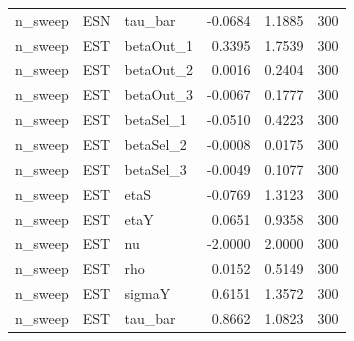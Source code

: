 \begin{table}[!h]
{\begin{tabular}[t]{lllrrr}
n_sweep & ESN & tau_bar & -0.0684 & 1.1885 & 300\\
n_sweep & EST & betaOut_1 & 0.3395 & 1.7539 & 300\\
\addlinespace
n_sweep & EST & betaOut_2 & 0.0016 & 0.2404 & 300\\
n_sweep & EST & betaOut_3 & -0.0067 & 0.1777 & 300\\
n_sweep & EST & betaSel_1 & -0.0510 & 0.4223 & 300\\
n_sweep & EST & betaSel_2 & -0.0008 & 0.0175 & 300\\
n_sweep & EST & betaSel_3 & -0.0049 & 0.1077 & 300\\
\addlinespace
n_sweep & EST & etaS & -0.0769 & 1.3123 & 300\\
n_sweep & EST & etaY & 0.0651 & 0.9358 & 300\\
n_sweep & EST & nu & -2.0000 & 2.0000 & 300\\
n_sweep & EST & rho & 0.0152 & 0.5149 & 300\\
n_sweep & EST & sigmaY & 0.6151 & 1.3572 & 300\\
\addlinespace
n_sweep & EST & tau_bar & 0.8662 & 1.0823 & 300\\
\bottomrule
\end{tabular}}
\end{table}
